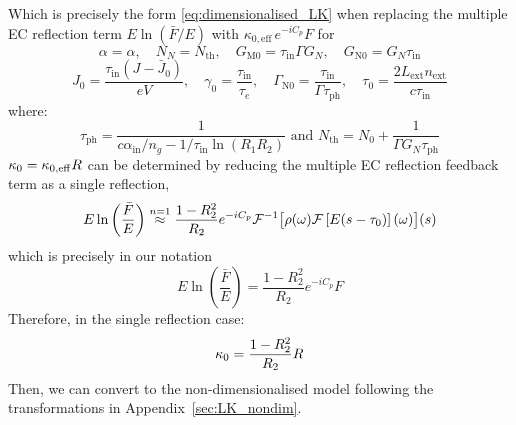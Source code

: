 %
Which is precisely the form \eqref{eq:dimensionalised_LK} when replacing the multiple EC reflection term $E \ln \left( \bar{F} / E \right)$ with $\kappa_{0,\mathrm{eff}} \, e^{-i C_p} F$ for
%
\[ \alpha = \alpha , \quad N_N = N_{\text{th}}, \quad G_\text{M0} = \tau_\text{in} \Gamma G_N, \quad G_\text{N0} = G_N \tau_\text{in} 
\]
\[
J_0 = \frac{\tau_\text{in}(J-\bar{J}_0)}{e V}, \quad \gamma_0 = \frac{\tau_\text{in}}{\tau_e}, \quad \Gamma_\text{N0} = \frac{\tau_\text{in}}{\Gamma \tau_\text{ph}}, \quad \tau_0 = \frac{2 L_\text{ext} n_\text{ext}}{c \tau_\text{in}} 
\]
%
where:
%
\begin{equation*}
\tau_\text{ph}=\frac{1}{c \alpha_\text{in} / n_g - 1 / \tau_\text{in} \ln \left(R_1 R_2\right)} \text{ and } N_{\text{th}} = N_0+\frac{1}{\Gamma G_N \tau_\text{ph}} 
\end{equation*}
%
$\kappa_0 = \kappa_{0,\mathrm{eff}} R$ can be determined by reducing the multiple EC reflection feedback term as a single reflection,
%
\begin{equation*}
E \ln \left( \frac{\bar{F}}{E} \right) \overset{n=1}{\approx} \frac{1-R_2^2}{R_2}e^{-iC_p} \mathcal{F}^{-1}\big[ \rho(\omega) \mathcal{F}\left[ E(s-\tau_0) \right](\omega) \big](s)
\end{equation*}
%
which is precisely in our notation
%
\begin{equation*}
E \ln \left(\frac{\bar{F}}{E}\right)=\frac{1-R_2^2}{R_2} e^{-i C_p} F
\end{equation*}
%
Therefore, in the single reflection case:
%
\begin{equation*}
    \kappa_0=\frac{1-R_2^2}{R_2} R
\end{equation*}
%
Then, we can convert to the non-dimensionalised model following the transformations in Appendix~\ref{sec:LK_nondim}.
%
%
